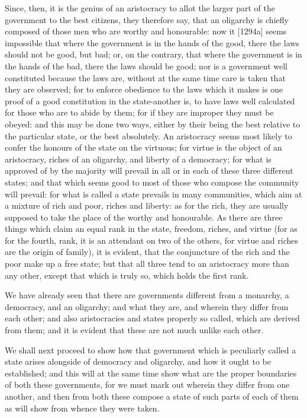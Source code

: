 Since, then, it is the genius of an aristocracy to allot the larger part
of the government to the best citizens, they therefore say, that an
oligarchy is chiefly composed of those men who are worthy and honourable:
now it [1294a] seems impossible that where the government is in the hands
of the good, there the laws should not be good, but bad; or, on the
contrary, that where the government is in the hands of the bad, there the
laws should be good; nor is a government well constituted because the laws
are, without at the same time care is taken that they are observed; for to
enforce obedience to the laws which it makes is one proof of a good
constitution in the state-another is, to have laws well calculated for
those who are to abide by them; for if they are improper they must be
obeyed: and this may be done two ways, either by their being the best
relative to the particular state, or the best absolutely. An aristocracy
seems most likely to confer the honours of the state on the virtuous; for
virtue is the object of an aristocracy, riches of an oligarchy, and
liberty of a democracy; for what is approved of by the majority will
prevail in all or in each of these three different states; and that which
seems good to most of those who compose the community will prevail: for
what is called a state prevails in many communities, which aim at a
mixture of rich and poor, riches and liberty: as for the rich, they are
usually supposed to take the place of the worthy and honourable. As there
are three things which claim an equal rank in the state, freedom, riches,
and virtue (for as for the fourth, rank, it is an attendant on two of the
others, for virtue and riches are the origin of family), it is evident,
that the conjuncture of the rich and the poor make up a free state; but
that all three tend to an aristocracy more than any other, except that
which is truly so, which holds the first rank.

We have already seen that there are governments different from a monarchy,
a democracy, and an oligarchy; and what they are, and wherein they differ
from each other; and also aristocracies and states properly so called,
which are derived from them; and it is evident that these are not much
unlike each other.


We shall next proceed to show how that government which is peculiarly
called a state arises alongside of democracy and oligarchy, and how it
ought to be established; and this will at the same time show what are the
proper boundaries of both these governments, for we must mark out wherein
they differ from one another, and then from both these compose a state of
such parts of each of them as will show from whence they were taken.


